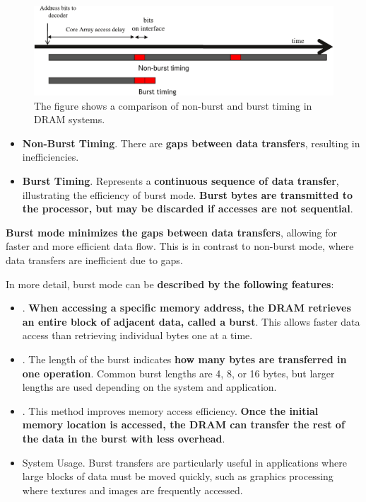 \begin{figure}[!htp]
    \centering
    \includegraphics[width=\textwidth]{img/cuda-dram-burst-1.pdf}
    \caption{The figure shows a comparison of non-burst and burst timing in DRAM systems.}
\end{figure}
\begin{itemize}
    \item \textbf{Non-Burst Timing}. There are \textbf{gaps between data transfers}, resulting in inefficiencies.

    \item \textbf{Burst Timing}. Represents a \textbf{continuous sequence of data transfer}, illustrating the efficiency of burst mode. \textbf{Burst bytes are transmitted to the processor, but may be discarded if accesses are not sequential}.
\end{itemize}
\textbf{Burst mode minimizes the gaps between data transfers}, allowing for faster and more efficient data flow. This is in contrast to non-burst mode, where data transfers are inefficient due to gaps.

\highspace
In more detail, burst mode can be \textbf{described by the following features}:
\begin{itemize}
    \item {}. \textbf{When accessing a specific memory address, the DRAM retrieves an entire block of adjacent data, called a burst}. This allows faster data access than retrieving individual bytes one at a time.
    
    \item {}. The length of the burst indicates \textbf{how many bytes are transferred in one operation}. Common burst lengths are 4, 8, or 16 bytes, but larger lengths are used depending on the system and application.
    
    \item {}. This method improves memory access efficiency. \textbf{Once the initial memory location is accessed, the DRAM can transfer the rest of the data in the burst with less overhead}.
    
    \item System Usage. Burst transfers are particularly useful in applications where large blocks of data must be moved quickly, such as graphics processing where textures and images are frequently accessed.
\end{itemize}

